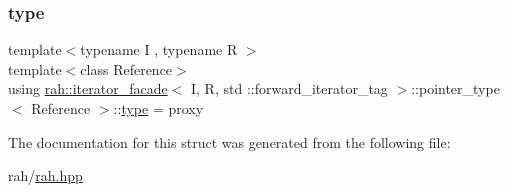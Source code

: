 \subsubsection{\texorpdfstring{type}{type}}
{\footnotesize\ttfamily template$<$typename I , typename R $>$ \\
template$<$class Reference$>$ \\
using \mbox{\hyperlink{structrah_1_1iterator__facade}{rah\+::iterator\+\_\+facade}}$<$ I, R, std \+::forward\+\_\+iterator\+\_\+tag $>$\+::pointer\+\_\+type$<$ Reference $>$\+::\mbox{\hyperlink{structrah_1_1iterator__facade_3_01_i_00_01_r_00_01std_01_1_1forward__iterator__tag_01_4_1_1pointer__type_a487aadc79237b4647ac568b4bbf6c45f}{type}} =  proxy}



The documentation for this struct was generated from the following file\+:\begin{DoxyCompactItemize}
\item 
rah/\mbox{\hyperlink{rah_8hpp}{rah.\+hpp}}\end{DoxyCompactItemize}
